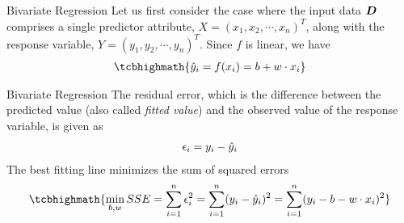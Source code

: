 %
\begin{frame}{Bivariate Regression}
Let us first consider the case where the input data ${\boldsymbol D}$ comprises a
single predictor attribute, $X = (x_1, x_2, \cdots, x_n)^T$, along with
the response variable, $Y = (y_1, y_2, \cdots, y_n)^T$.
Since $f$ is linear, we have
\begin{align}
    \tcbhighmath{
    \hy_i = f(x_i) = b + w \cdot x_i}
    \label{eq:reg:linear:bivariate}
\end{align}
\end{frame}
%
\begin{frame}{Bivariate Regression}
The residual error, which is the difference between the predicted value (also called {\em fitted value}) 
and the observed value of the response
variable, is given as
\begin{align}
    \epsilon_i = y_i - \hat{y}_i
\end{align}
The best fitting line minimizes the sum of squared errors
\begin{align}
    \tcbhighmath{
    \min_{b, w} SSE  = \sum_{i=1}^n \epsilon_i^2
     = \sum_{i=1}^n (y_i - \hy_i)^2
 =  \sum_{i=1}^n (y_i - b - w \cdot x_i)^2}
 \label{eq:reg:linear:bivar_SSE_obj}
\end{align}
%
\end{frame}
